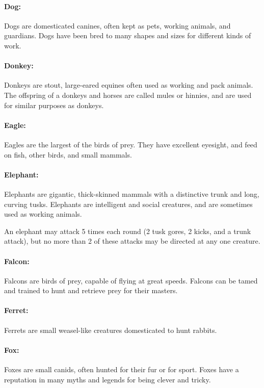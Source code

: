 \begin{multicols}{2}
\paragraph{Dog:} Dogs are domesticated canines, often kept as pets, working animals, and guardians. Dogs have been bred to many shapes and sizes for different kinds of work.

\paragraph{Donkey:} Donkeys are stout, large-eared equines often used as working and pack animals. The offspring of a donkeys and horses are called mules or hinnies, and are used for similar purposes as donkeys.

\paragraph{Eagle:} Eagles are the largest of the birds of prey. They have excellent eyesight, and feed on fish, other birds, and small mammals.

\paragraph{Elephant:} Elephants are gigantic, thick-skinned mammals with a distinctive trunk and long, curving tusks. Elephants are intelligent and social creatures, and are sometimes used as working animals.

An elephant may attack 5 times each round (2 tusk gores, 2 kicks, and a trunk attack), but no more than 2 of these attacks may be directed at any one creature.

\paragraph{Falcon:} Falcons are birds of prey, capable of flying at great speeds. Falcons can be tamed and trained to hunt and retrieve prey for their masters.

\paragraph{Ferret:} Ferrets are small weasel-like creatures domesticated to hunt rabbits. 

\paragraph{Fox:} Foxes are small canids, often hunted for their fur or for sport. Foxes have a reputation in many myths and legends for being clever and tricky.


\end{multicols}
